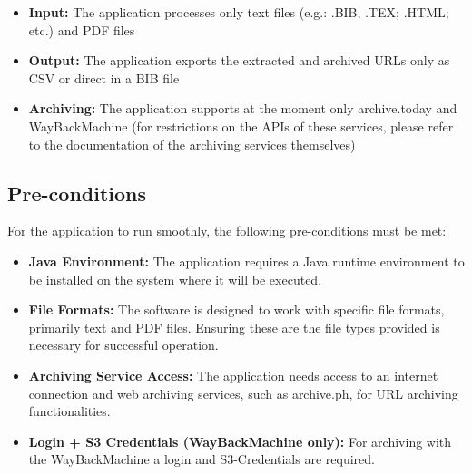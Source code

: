 \begin{itemize}
    \item \textbf{Input:} The application processes only text files (e.g.: .BIB, .TEX; .HTML; etc.) and PDF files
    \item \textbf{Output:} The application exports the extracted and archived URLs only as CSV or direct in a BIB file
    \item \textbf{Archiving:} The application supports at the moment only archive.today and WayBackMachine (for restrictions on the APIs of these services, please refer to the documentation of the archiving services themselves)
\end{itemize}
\clearpage
\subsection{Pre-conditions}
For the application to run smoothly, the following pre-conditions must be met:

\begin{itemize}
    \item \textbf{Java Environment:} The application requires a Java runtime environment to be installed on the system where it will be executed.
    \item \textbf{File Formats:} The software is designed to work with specific file formats, primarily text and PDF files. Ensuring these are the file types provided is necessary for successful operation.
    \item \textbf{Archiving Service Access:} The application needs access to an internet connection and web archiving services, such as archive.ph, for URL archiving functionalities.
    \item \textbf{Login + S3 Credentials (WayBackMachine only):} For archiving with the WayBackMachine a login and S3-Credentials are required.
\end{itemize}
\clearpage